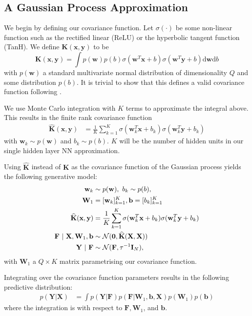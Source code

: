\documentclass{article} %
\def\red#1{\textcolor{red}{#1}}
\newcommand{\N}{\mathcal{N}}
\newcommand{\svert}{~|~}
\newcommand{\td}{\text{d}}
\newcommand{\x}{\mathbf{x}}
\newcommand{\Bb}{\mathbf{b}}
\newcommand{\y}{\mathbf{y}}
\newcommand{\w}{\mathbf{w}}
\newcommand{\W}{\mathbf{W}}
\newcommand{\X}{\mathbf{X}}
\newcommand{\Y}{\mathbf{Y}}
\newcommand{\F}{\mathbf{F}}
\newcommand{\I}{\mathbf{I}}
\newcommand{\bz}{\mathbf{0}}
\newcommand{\K}{\mathbf{K}}
\newcommand{\Kh}{\widehat{\mathbf{K}}}
\theoremstyle{definition}
\begin{document}
\subsection{A Gaussian Process Approximation} \label{sect:gp_approx_model}

We begin by defining our covariance function. Let $\sigma(\cdot)$ be some non-linear function such as the rectified linear (ReLU) or the hyperbolic tangent function (TanH).
We define $\K(\x, \y)$ to be 
$$
\K(\x, \y) = \int p(\w) p(b) \sigma(\w^T \x + b) \sigma(\w^T \y + b) \td \w \td b
$$
with $p(\w)$ a standard multivariate normal distribution of dimensionality $Q$ and some distribution $p(b)$. It is trivial to show that this defines a valid covariance function following \citep{tsuda2002marginalized}.

We use Monte Carlo integration with $K$ terms to approximate the integral above. This results in the finite rank covariance function
\begin{align*}
\Kh(\x, \y) &= 
\frac{1}{K} \sum_{k=1}^K 
 \sigma(\w_k^T \x + b_k) \sigma(\w_k^T \y + b_k)
\end{align*}
with $\w_k \sim p(\w)$ and $b_k \sim p(b)$. $K$ will be the number of hidden units in our single hidden layer NN approximation. 

Using $\Kh$ instead of $\K$ as the covariance function of the Gaussian process yields the following generative model: %
\begin{align} \label{eq:generative_model_approx}
\w_k &\sim p(\w), 
~b_k \sim p(b), \notag\\
\W_1 &= [\w_k]_{k=1}^K, \Bb = [b_k]_{k=1}^K \notag\\
\Kh(\x, \y) &= \frac{1}{K} \sum_{k=1}^K 
 \sigma(\w_k^T \x + b_k) \sigma(\w_k^T \y + b_k) \notag\\
\F \svert \X, \W_1, \Bb &\sim \N(\bz, \Kh(\X, \X)) \notag\\
\Y \svert \F &\sim \N(\F, \tau^{-1} \I_N),
\end{align}
with $\W_1$ a $Q \times K$ matrix parametrising our covariance function.

Integrating over the covariance function parameters results in the following predictive distribution:
\begin{align*}
p(\Y | \X) &= \int p(\Y | \F) p(\F | \W_1, \Bb, \X) p(\W_1) p(\Bb) %
\end{align*}
where the integration is with respect to $\F, \W_1$, and $\Bb$.
\end{document}
